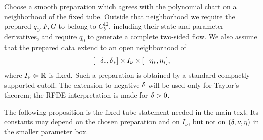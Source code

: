 Choose a smooth preparation which agrees with the polynomial chart on a
neighborhood of the fixed tube.  Outside that neighborhood we require the
prepared \(q_0,F,G\) to belong to \(C_b^{12}\), including their state and
parameter derivatives, and require \(q_0\) to generate a complete
two-sided flow.  We also assume that the prepared data extend to an open
neighborhood of
\begin{equation}
\label{eq:app-parameter-box-star}
 [-\delta_*,\delta_*]\times I_\nu\times[-\eta_*,\eta_*],
\end{equation}
where \(I_\nu\Subset\mathbb R\) is fixed.  Such a preparation is obtained by a
standard compactly supported cutoff.  The extension to negative \(\delta\)
will be used only for Taylor's theorem; the RFDE interpretation is made for
\(\delta>0\).

The following proposition is the fixed-tube statement needed in the main
text.  Its constants may depend on the chosen preparation and on
\(I_\nu\), but not on \((\delta,\nu,\eta)\) in the smaller parameter box.

